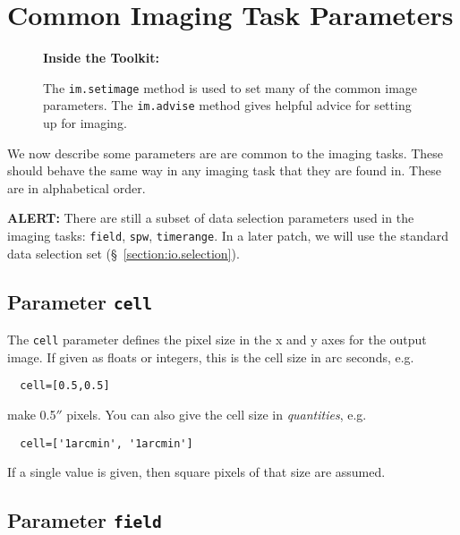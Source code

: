 \section{Common Imaging Task Parameters}
\label{section:im.pars}

\begin{wrapfigure}{r}{2.5in}
  \begin{boxedminipage}{2.5in}
     \centerline{\bf Inside the Toolkit:}
     The {\tt im.setimage} method is used to set many of the
     common image parameters.  The {\tt im.advise} method
     gives helpful advice for setting up for imaging.
  \end{boxedminipage}
\end{wrapfigure}

We now describe some parameters are are common to the imaging
tasks.  These should behave the same way in any imaging task
that they are found in.  These are in alphabetical order.

{\bf ALERT:} There are still a subset of
data selection parameters used in the imaging tasks:
{\tt field}, {\tt spw}, {\tt timerange}.
In a later patch, we will use 
the standard data selection set (\S~\ref{section:io.selection}).

\subsection{Parameter {\tt cell} }
\label{section:im.pars.cell}

The {\tt cell} parameter defines the pixel size in the
x and y axes for the output
image.  If given as floats or integers, this is the cell size
in arc seconds, e.g.
\small
\begin{verbatim}
  cell=[0.5,0.5]
\end{verbatim}
\normalsize
make 0.5$''$ pixels.
You can also give the cell size in {\it quantities}, e.g.
\small
\begin{verbatim}
  cell=['1arcmin', '1arcmin']
\end{verbatim}
\normalsize
If a single value is given, then square pixels of that size
are assumed.

\subsection{Parameter {\tt field} }
\label{section:im.pars.field}

